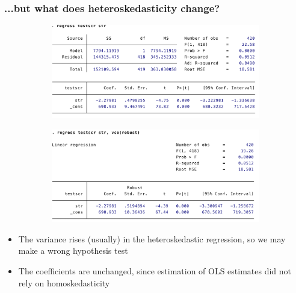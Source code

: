 \documentclass[aspectratio=169]{beamer}
\begin{document}
\begin{frame}
\frametitle{...but what does heteroskedasticity change?}
\begin{figure}[H]
\centering
\begin{subfigure}[b]{0.49\textwidth}
\includegraphics[width=\textwidth]{nonrobust.png}
\end{subfigure}
\begin{subfigure}[b]{0.49\textwidth}
\includegraphics[width=\textwidth]{robust.png}
\end{subfigure}
\end{figure}
\begin{itemize}
\item The variance rises (usually) in the heteroskedastic regression, so we may make a wrong hypothesis test
\item The coefficients are unchanged, since estimation of OLS estimates did not rely on homoskedasticity
\end{itemize}
\end{frame}



\end{document}

